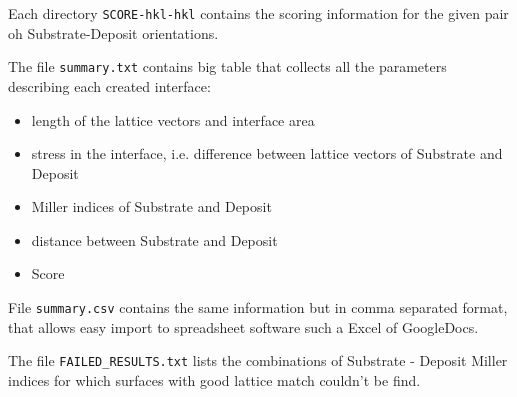 \documentclass[a4paper,12pt,oneside]{article}
\begin{document}
Each directory \texttt{SCORE-hkl-hkl} contains the scoring information for the
given pair oh Substrate-Deposit orientations.

The file \texttt{summary.txt} contains big table that collects all the
parameters describing each created interface:
\begin{itemize}
\item length of the lattice vectors and interface area
\item stress in the interface, i.e. difference between lattice vectors of
Substrate and Deposit
\item Miller indices of Substrate and Deposit
\item distance between Substrate and Deposit
\item Score
\end{itemize}
File \texttt{summary.csv} contains the same information but in comma separated
format, that allows easy import to spreadsheet software such a Excel of
GoogleDocs.

The file \texttt{FAILED\_RESULTS.txt} lists the combinations of Substrate -
Deposit Miller indices for which surfaces with good lattice match couldn't be
find. 
\end{document}
